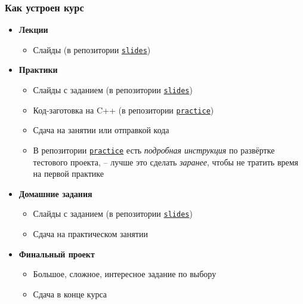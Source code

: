 \documentclass[10pt]{beamer}
\begin{document}
\begin{frame}
\frametitle{Как устроен курс}
\begin{itemize}
\item \textbf{Лекции}
\begin{itemize}
\item Слайды (в репозитории \href{https://github.com/lisyarus/graphics-course-slides/tree/master/pdf}{\nolinkurl{slides}})
\end{itemize}
\pause
\item \textbf{Практики}
\pause
\begin{itemize}
\item Слайды с заданием (в репозитории \href{https://github.com/lisyarus/graphics-course-slides/tree/master/pdf}{\nolinkurl{slides}})
\pause
\item Код-заготовка на C++ (в репозитории \href{https://github.com/lisyarus/graphics-course-practice}{\nolinkurl{practice}})
\pause
\item Сдача на занятии или отправкой кода
\pause
\item В репозитории \href{https://github.com/lisyarus/graphics-course-practice}{\nolinkurl{practice}} есть \textit{подробная инструкция} по развёртке тестового проекта, -- лучше это сделать \textit{заранее}, чтобы не тратить время на первой практике
\end{itemize}
\pause
\item \textbf{Домашние задания}
\pause
\begin{itemize}
\item Слайды с заданием (в репозитории \href{https://github.com/lisyarus/graphics-course-slides/tree/master/pdf}{\nolinkurl{slides}})
\pause
\item Сдача на практическом занятии
\end{itemize}
\pause
\item \textbf{Финальный проект}
\begin{itemize}
\item Большое, сложное, интересное задание по выбору
\pause
\item Сдача в конце курса
\end{itemize}
\end{itemize}
\end{frame}
\end{document}

